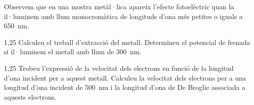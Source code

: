 Observem que en una mostra metàl·lica apareix l'efecte fotoelèctric quan la il·luminem amb llum monocromàtica de longituds d'ona més petites o iguals a 650~nm.

\begin{apartat}{1,25}
Calculeu el treball d'extracció del metall. Determineu el potencial de frenada si il·luminem el metall amb llum de 300~nm.
\end{apartat}

\begin{apartat}{1,25}
Trobeu l'expressió de la velocitat dels electrons en funció de la longitud d'ona incident per a aquest metall. Calculeu la velocitat dels electrons per a una longitud d'ona incident de 500~nm i la longitud d'ona de De Broglie associada a aquests electrons.
\end{apartat}

